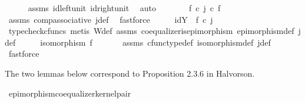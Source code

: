 \begin{isabellebody}
\ \ \ \ \isamarkupfalse%
\ assms{\isacharparenleft}{\kern0pt}{}{\isacharparenright}{\kern0pt}\ id{\isacharunderscore}{\kern0pt}left{\isacharunderscore}{\kern0pt}unit{}\ id{\isacharunderscore}{\kern0pt}right{\isacharunderscore}{\kern0pt}unit{}\ \isamarkupfalse%
\ auto\isanewline
\ \ \isamarkupfalse%
\ \isamarkupfalse%
\ {\isachardoublequoteopen}{\isachardot}{\kern0pt}{\isachardot}{\kern0pt}{\isachardot}{\kern0pt}\ {\isacharequal}{\kern0pt}\ {\isacharparenleft}{\kern0pt}f\ {\isasymcirc}\isactrlsub c\ j{\isacharparenright}{\kern0pt}\ {\isasymcirc}\isactrlsub c\ f{\isachardoublequoteclose}\isanewline
\ \ \ \ \ \isamarkupfalse%
\ assms{\isacharparenleft}{\kern0pt}{}{\isacharparenright}{\kern0pt}\ comp{\isacharunderscore}{\kern0pt}associative{}\ j{\isacharunderscore}{\kern0pt}def\ \isamarkupfalse%
\ fastforce\isanewline
\ \ \isamarkupfalse%
\ \isamarkupfalse%
\ {\isachardoublequoteopen}id{\isacharparenleft}{\kern0pt}Y{\isacharparenright}{\kern0pt}\ {\isacharequal}{\kern0pt}\ f\ {\isasymcirc}\isactrlsub c\ j{\isachardoublequoteclose}\isanewline
\ \ \ \ \isamarkupfalse%
\ {\isacharparenleft}{\kern0pt}typecheck{\isacharunderscore}{\kern0pt}cfuncs{\isacharcomma}{\kern0pt}\ metis\ W{\isacharunderscore}{\kern0pt}def\ assms{\isacharparenleft}{\kern0pt}{}{\isacharparenright}{\kern0pt}\ coequalizer{\isacharunderscore}{\kern0pt}is{\isacharunderscore}{\kern0pt}epimorphism\ epimorphism{\isacharunderscore}{\kern0pt}def{}\ j{\isacharunderscore}{\kern0pt}def{\isacharparenright}{\kern0pt}\isanewline
\ \ \isamarkupfalse%
\ \isamarkupfalse%
\ {\isachardoublequoteopen}isomorphism\ f{\isachardoublequoteclose}\isanewline
\ \ \ \ \isamarkupfalse%
\ \ assms{\isacharparenleft}{\kern0pt}{}{\isacharparenright}{\kern0pt}\ cfunc{\isacharunderscore}{\kern0pt}type{\isacharunderscore}{\kern0pt}def\ isomorphism{\isacharunderscore}{\kern0pt}def\ j{\isacharunderscore}{\kern0pt}def\ \isamarkupfalse%
\ fastforce\ \ \isanewline
{}\isamarkupfalse%
%
\endisatagproof
{\isafoldproof}%
%
\isadelimproof
%
\endisadelimproof
%
\begin{isamarkuptext}%
The two lemmas below correspond to Proposition 2.3.6 in Halvorson.%
\end{isamarkuptext}\isamarkuptrue%
\isamarkupfalse%
\ epimorphism{\isacharunderscore}{\kern0pt}coequalizer{\isacharunderscore}{\kern0pt}kernel{\isacharunderscore}{\kern0pt}pair{\isacharcolon}{\kern0pt}\isanewline

\end{isabellebody}
